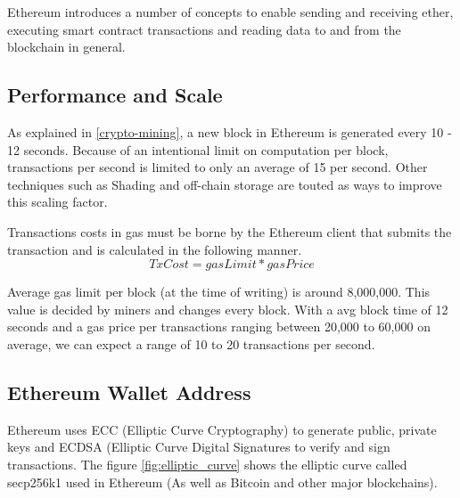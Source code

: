 \documentclass[11pt,openright]{report}
\begin{document}
Ethereum introduces a number of concepts to enable sending and receiving ether, executing smart contract transactions and reading data to and from the blockchain in general.



\subsection{Performance and Scale}
As explained in \ref{crypto-mining}, a new block in Ethereum is generated every 10 - 12 seconds. Because of an intentional limit on computation per block, transactions per second is limited to only an average of 15 per second. Other techniques such as Shading and off-chain storage are touted as ways to improve this scaling factor. 

Transactions costs in gas must be borne by the Ethereum client that submits the transaction and is calculated in the following manner.
\begin{equation}
    TxCost = gasLimit * gasPrice
\end{equation}

Average gas limit per block (at the time of writing) is around 8,000,000. This value is decided by miners and changes every block. With a avg block time of 12 seconds and a gas price per transactions ranging between 20,000 to 60,000 on average, we can expect a range of 10 to 20 transactions per second. 

\subsection{Ethereum Wallet Address}
Ethereum uses ECC (Elliptic Curve Cryptography) to generate public, private keys and ECDSA (Elliptic Curve Digital Signatures to verify and sign transactions. The figure \ref{fig:elliptic_curve} shows the elliptic curve called secp256k1 used in Ethereum (As well as Bitcoin and other major blockchains).
\end{document}
